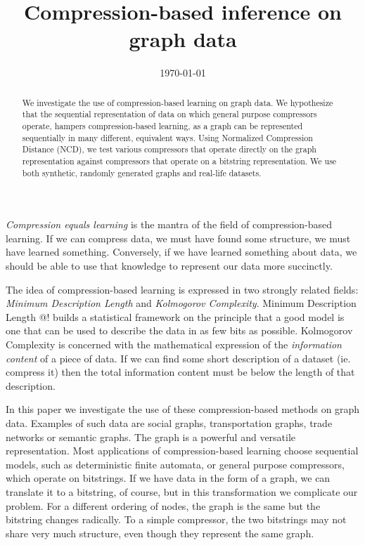 \documentclass[10pt,a4paper,oneside]{article}
\title{Compression-based inference on graph data}
\date{\today}
\begin{document}
\maketitle

\begin{abstract}
We investigate the use of compression-based learning on graph data. We hypothesize that the sequential representation of data on which general purpose compressors operate, hampers compression-based learning, as a graph can be represented sequentially in many different, equivalent ways. Using Normalized Compression Distance (NCD), we test various compressors that operate directly on the graph representation against compressors that operate on a bitstring representation. We use both synthetic, randomly generated graphs and real-life datasets. 
\end{abstract}

\emph{Compression equals learning} is the mantra of the field of compression-based learning. If we can compress data, we must have found some structure, we must have learned something. Conversely, if we have learned something about data, we should be able to use that knowledge to represent our data more succinctly.

The idea of compression-based learning is expressed in two strongly related fields: \emph{Minimum Description Length} and \emph{Kolmogorov Complexity}. Minimum Description Length \cite{}@! builds a statistical framework on the principle that a good model is one that can be used to describe the data in as few bits as possible. Kolmogorov Complexity is concerned with the mathematical expression of the \emph{information content} of a piece of data. If we can find some short description of a dataset (ie. compress it) then the total information content must be below the length of that description.

In this paper we investigate the use of these compression-based methods on graph data. Examples of such data are social graphs, transportation graphs, trade networks or semantic graphs. The graph is a powerful and versatile representation. Most applications of compression-based learning choose sequential models, such as deterministic finite automata, or general purpose compressors, which operate on bitstrings. If we have data in the form of a graph, we can translate it to a bitstring, of course, but in this transformation we complicate our problem. For a different ordering of nodes, the graph is the same but the bitstring changes radically. To a simple compressor, the two bitstrings may not share very much structure, even though they represent the same graph.
\end{document}
